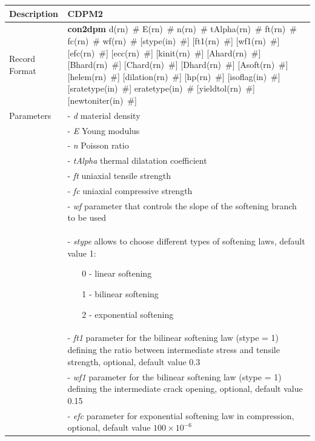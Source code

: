 \documentclass[a4paper]{article}
\newcommand{\descitem}[1]{{\noindent \bf #1}}
\newcommand{\elemparam}[2]{{{#1\tiny (#2)}~\#}}
\newcommand{\param}[1]{{\it #1}}
\newenvironment{mmt}{\begin{tabular}{|l|p{9cm}|}}{\end{tabular}\\}
\newenvironment{mmt}{\begin{tabular}{|l|l|}}{\end{tabular}\\}
\begin{document}
\begin{longtable}{|l|p{9cm}|}
\hline
Description & CDPM2\\
\hline
Record Format & \descitem{con2dpm}  \elemparam{d}{rn} \elemparam{E}{rn} \elemparam{n}{rn} \elemparam{tAlpha}{rn} \elemparam{ft}{rn} \elemparam{fc}{rn} \elemparam{wf}{rn} [\elemparam{stype}{in}] [\elemparam{ft1}{rn}] [\elemparam{wf1}{rn}] [\elemparam{efc}{rn}] [\elemparam{ecc}{rn}] [\elemparam{kinit}{rn}] [\elemparam{Ahard}{rn}] [\elemparam{Bhard}{rn}] [\elemparam{Chard}{rn}] [\elemparam{Dhard}{rn}] [\elemparam{Asoft}{rn}] [\elemparam{helem}{rn}] [\elemparam{dilation}{rn}] [\elemparam{hp}{rn}] [\elemparam{isoflag}{in}] [\elemparam{sratetype}{in}] \elemparam{eratetype}{in} [\elemparam{yieldtol}{rn}] [\elemparam{newtoniter}{in}] \\
Parameters &- \param{d} material density\\
&- \param{E} Young modulus\\
&- \param{n} Poisson ratio\\
&- \param{tAlpha} thermal dilatation coefficient\\
&- \param{ft} uniaxial tensile strength\\
&- \param{fc} uniaxial compressive strength\\
&- \param{wf} parameter that controls the slope of the softening branch to be used\\
&- \param{stype} allows to choose different types of softening laws, default value 1:
\begin{itemize}\setlength{\itemsep}{-3pt}
\item[0 -] linear softening 
\item[1 -] bilinear softening
\item[2 -] exponential softening
\end{itemize}\\
&- \param{ft1}  parameter for the bilinear softening law (stype = 1) defining the ratio between intermediate stress and tensile strength, optional, default value 0.3\\
&- \param{wf1}  parameter for the bilinear softening law (stype = 1) defining the intermediate crack opening, optional, default value 0.15\\
&- \param{efc}  parameter for exponential softening law in compression, optional, default value $100 \times 10^{-6}$\\

\end{longtable}
\end{document}

